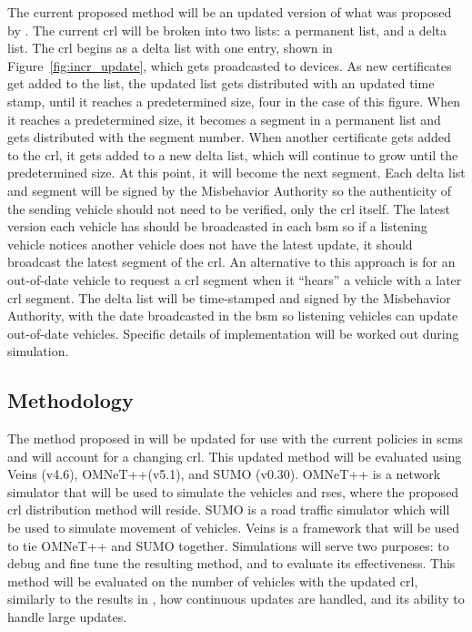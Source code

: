 \documentclass {article}
\begin{document}
The current proposed method will be an updated version of what was proposed by \autocite{haas_efficient_2011}. The current \gls{crl} will be broken into two lists: a permanent list, and a delta list. The \gls{crl} begins as a delta list with one entry, shown in Figure~\ref{fig:incr_update}, which gets proadcasted to devices. As new certificates get added to the list, the updated list gets distributed with an updated time stamp, until it reaches a predetermined size, four in the case of this figure. When it reaches a predetermined size, it becomes a segment in a permanent list and gets distributed with the segment number. When another certificate gets added to the \gls{crl}, it gets added to a new delta list, which will continue to grow until the predetermined size. At this point, it will become the next segment. Each delta list and segment will be signed by the Misbehavior Authority so the authenticity of the sending vehicle should not need to be verified, only the \gls{crl} itself. The latest version each vehicle has should be broadcasted in each \gls{bsm} so if a listening vehicle notices another vehicle does not have the latest update, it should broadcast the latest segment of the \gls{crl}. An alternative to this approach is for an out-of-date vehicle to request a \gls{crl} segment when it ``hears'' a vehicle with a later \gls{crl} segment. The delta list will be time-stamped and signed by the Misbehavior Authority, with the date broadcasted in the \gls{bsm} so listening vehicles can update out-of-date vehicles. Specific details of implementation will be worked out during simulation.

\subsection{Methodology}
The method proposed in \autocite{haas_efficient_2011} will be updated for use with the current policies in \gls{scms} and will account for a changing \gls{crl}. This updated method will be evaluated using Veins (v4.6), OMNeT++(v5.1), and SUMO (v0.30). OMNeT++ is a network simulator that will be used to simulate the vehicles and \gls{rse}s, where the proposed \gls{crl} distribution method will reside. SUMO is a road traffic simulator which will be used to simulate movement of vehicles. Veins is a framework that will be used to tie OMNeT++ and SUMO together. Simulations will serve two purposes: to debug and fine tune the resulting method, and to evaluate its effectiveness. This method will be evaluated on the number of vehicles with the updated \gls{crl}, similarly to the results in \autocite{haas_efficient_2011}, how continuous updates are handled, and its ability to handle large updates.
\end{document}

